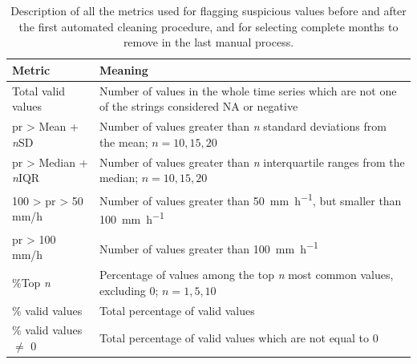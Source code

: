 \begin{table}
\centering
\begin{tabularx}{\textwidth}{lX}
\toprule
Metric                                   &
                                         Meaning \\ \midrule
Total valid values                       &
                                         Number of values in the whole time series which are not one of the strings considered NA or negative \\
pr \textgreater{} Mean + \emph{n}SD      &
                                         Number of values greater than \emph{n} standard deviations from the mean; $n=10,15,20$\\
pr \textgreater{}  Median + \emph{n}IQR  &
                                         Number of values greater than \emph{n} interquartile ranges from the median; $n=10,15,20$   \\
100 \textgreater{}  pr \textgreater{}  50 mm/h &
                                         Number of values greater than \SI{50}{\milli\metre\per\hour}, but smaller than \SI{100}{\milli\metre\per\hour} \\
pr \textgreater{} 100 mm/h               &
                                         Number of values greater than \SI{100}{\milli\metre\per\hour} \\
\%Top \emph{n}                           &
                                         Percentage of values among the top \emph{n} most common values, excluding 0; $n=1, 5, 10$ \\
\% valid values                          &
                                         Total percentage of valid values \\
\% valid values $\neq$ 0                    &
                                         Total percentage of valid values which are not equal to 0 \\
\end{tabularx}
\decoRule
\caption[Description of all used metrics for suspicious values]{Description of all the metrics used for flagging suspicious values before and after the first automated cleaning procedure, and for selecting complete months to remove in the last manual process.}
\label{tab:flags_descr}
\end{table}

